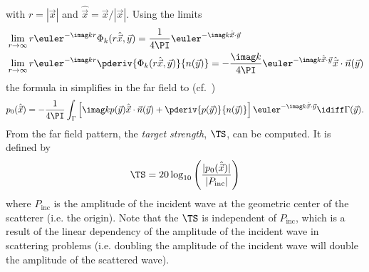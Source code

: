 with $r = |\vec{x}|$ and $\hat{\vec{x}} = \vec{x}/|\vec{x}|$. Using the limits
\begin{equation}\label{Eq3:Phi_k_limits}
\begin{aligned}
	&\lim_{r\to\infty} r\euler^{-\imag k r}\Phi_k(r\hat{\vec{x}},\vec{y}) = \frac{1}{4\PI}\euler^{-\imag k \hat{\vec{x}}\cdot\vec{y}}\\
	&\lim_{r\to\infty} r\euler^{-\imag k r}\pderiv{\Phi_k(r\hat{\vec{x}},\vec{y})}{n(\vec{y})} = -\frac{\imag k}{4\PI}\euler^{-\imag k \hat{\vec{x}}\cdot\vec{y}}\hat{\vec{x}}\cdot\vec{n}(\vec{y})
\end{aligned}
\end{equation}
the formula in  simplifies in the far field to (cf.~\cite[p. 32]{Ihlenburg1998fea})
\begin{equation}\label{Eq3:KirchhoffIntegralFarField}
	p_0(\hat{\vec{x}}) = -\frac{1}{4\PI}\int_{\Gamma}\left[ \imag k p(\vec{y})\hat{\vec{x}}\cdot\vec{n}(\vec{y}) + \pderiv{p(\vec{y})}{n(\vec{y})}\right]\euler^{-\imag k \hat{\vec{x}}\cdot\vec{y}}\idiff \Gamma(\vec{y}).
\end{equation}
From the far field pattern, the \textit{target strength}, $\TS$, can be computed. It is defined by
\begin{equation}\label{Eq3:TS}
	\TS = 20\log_{10}\left(\frac{|p_0(\hat{\vec{x}})|}{|P_{\mathrm{inc}}|}\right)
\end{equation}
where $P_{\mathrm{inc}}$ is the amplitude of the incident wave at the geometric center of the scatterer (i.e. the origin). Note that the $\TS$ is independent of $P_{\mathrm{inc}}$, which is a result of the linear dependency of the amplitude of the incident wave in scattering problems (i.e. doubling the amplitude of the incident wave will double the amplitude of the scattered wave).